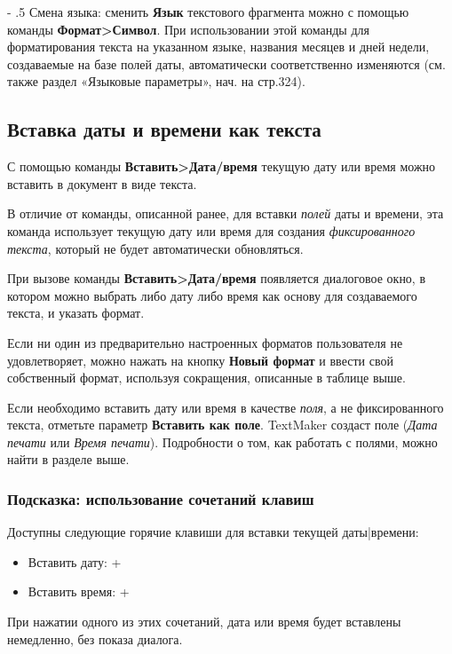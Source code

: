 \documentclass[a4paper,10pt]{article}
\makeatletter
\renewcommand\paragraph{%
   \@startsection{paragraph}{4}{0mm}%
      {-\baselineskip}%
      {.5\baselineskip}%
      {\normalfont\normalsize\bfseries}}
\makeatother
\begin{document}
\paragraph{Смена языка:} сменить \textbf{Язык} текстового фрагмента можно с помощью команды \textbf{Формат>Символ}. При использовании этой команды для форматирования текста на указанном языке, названия месяцев и дней недели, создаваемые на базе полей даты, автоматически соответственно изменяются (см. также раздел «Языковые параметры», нач. на стр.324).

\subsection{Вставка даты и времени как текста}
С помощью команды \textbf{Вставить>Дата/время} текущую дату или время можно вставить в документ в виде текста.

В отличие от команды, описанной ранее, для вставки \textit{полей} даты и времени, эта команда использует текущую дату или время для создания \textit{фиксированного текста}, который не будет автоматически обновляться.

При вызове команды \textbf{Вставить>Дата/время} появляется диалоговое окно, в котором можно выбрать либо дату либо время как основу для создаваемого текста, и указать формат.

Если ни один из предварительно настроенных форматов пользователя не удовлетворяет, можно нажать на кнопку \textbf{Новый формат} и ввести свой собственный формат, используя сокращения, описанные в таблице выше.

Если необходимо вставить дату или время в качестве \textit{поля}, а не фиксированного текста, отметьте параметр \textbf{Вставить как поле}. TextMaker создаст поле (\textit{Дата печати} или \textit{Время печати}). Подробности о том, как работать с полями, можно найти в разделе выше.

\subsubsection{Подсказка: использование сочетаний клавиш}
Доступны следующие горячие клавиши для вставки текущей даты|времени:
\begin{itemize}
 \item Вставить дату: +
 \item Вставить время: +\keys{:}
\end{itemize}

При нажатии одного из этих сочетаний, дата или время будет вставлены немедленно, без показа диалога.
\end{document}
